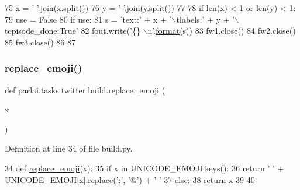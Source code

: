 \begin{DoxyCode}
75         x = \textcolor{stringliteral}{' '}.join(x.split())
76         y = \textcolor{stringliteral}{' '}.join(y.split())
77 
78         \textcolor{keywordflow}{if} len(x) < 1 \textcolor{keywordflow}{or} len(y) < 1:
79             use = \textcolor{keyword}{False}
80         \textcolor{keywordflow}{if} use:
81             s = \textcolor{stringliteral}{'text:'} + x + \textcolor{stringliteral}{'\(\backslash\)tlabels:'} + y + \textcolor{stringliteral}{'\(\backslash\)tepisode\_done:True'}
82             fout.write(\textcolor{stringliteral}{'\{\} \(\backslash\)n'}.\hyperlink{namespaceparlai_1_1chat__service_1_1services_1_1messenger_1_1shared__utils_a32e2e2022b824fbaf80c747160b52a76}{format}(s))
83     fw1.close()
84     fw2.close()
85     fw3.close()
86 
87 
\end{DoxyCode}
\mbox{\label{namespaceparlai_1_1tasks_1_1twitter_1_1build_aea2acf2542f3fb1294fa121bb7cb1a76}} 
\subsubsection{\texorpdfstring{replace\+\_\+emoji()}{replace\_emoji()}}
{\footnotesize\ttfamily def parlai.\+tasks.\+twitter.\+build.\+replace\+\_\+emoji (\begin{DoxyParamCaption}\item[{}]{x }\end{DoxyParamCaption})}



Definition at line 34 of file build.\+py.


\begin{DoxyCode}
34 \textcolor{keyword}{def }\hyperlink{namespaceparlai_1_1tasks_1_1twitter_1_1build_aea2acf2542f3fb1294fa121bb7cb1a76}{replace\_emoji}(x):
35     \textcolor{keywordflow}{if} x \textcolor{keywordflow}{in} UNICODE\_EMOJI.keys():
36         \textcolor{keywordflow}{return} \textcolor{stringliteral}{' '} + UNICODE\_EMOJI[x].replace(\textcolor{stringliteral}{':'}, \textcolor{stringliteral}{'@'}) + \textcolor{stringliteral}{' '}
37     \textcolor{keywordflow}{else}:
38         \textcolor{keywordflow}{return} x
39 
40 
\end{DoxyCode}
\mbox{\label{namespaceparlai_1_1tasks_1_1twitter_1_1build_a6296215f669301c1e46b7588e1291ae7}} 
